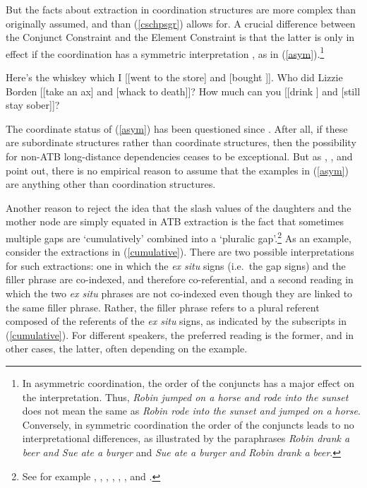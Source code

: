 \documentclass[output=paper
 	        ,biblatex
                ,babelshorthands
                ,newtxmath
                ,draftmode
                ,colorlinks, citecolor=brown
]{langscibook}
\begin{document}
But the facts about extraction in coordination structures are more complex than originally assumed, and than (\ref{cschpsgr}) allows for. A crucial  difference between the Conjunct Constraint and the Element Constraint is  that the latter is only in effect if the coordination has a symmetric interpretation  \citep{Ross67,goldsmith,lakoff86,levinprince86}, as in  (\ref{asym}).\footnote{In asymmetric coordination, the order of the conjuncts has a major effect on the interpretation.
  Thus, \emph{Robin jumped on a horse and rode into the sunset} does not 
mean the same as  \emph{Robin rode into the sunset and jumped on a horse}. Conversely,
in symmetric coordination the order of the conjuncts leads to no interpretational  differences,
as illustrated by the paraphrases \emph{Robin drank a beer and Sue ate a burger}
and \emph{Sue ate a burger and Robin drank a beer}.}


\eal  \label{asym}
\ex
 Here's the whiskey  which I [[went to the store] and [bought \spc]].
\ex Who did Lizzie Borden [[take an ax] and [whack \spcs to death]]?
\ex How much can you [[drink \spc] and [still stay sober]]?
\zl


\noindent
The coordinate status of (\ref{asym}) has been questioned since \cite{Ross67}. After all, if these are subordinate structures rather than coordinate structures, then the possibility for non-ATB long-distance dependencies ceases to be exceptional. But as 
\citet{schmerling72},  \citet{lakoff86}, \citet{levinepostal} and \citet{kehler}  point out,  there is no empirical reason to assume that the examples in (\ref{asym}) are anything other than coordination structures. 

Another reason to reject the idea that  the {\sc slash} values of the daughters and the mother node are simply equated in ATB extraction is the fact that sometimes multiple gaps are `cumulatively' combined into a `pluralic gap'.\footnote{See for example  \citet{munn98atb,munn99atb},  \citet[136, 160]{postal98},
    \citet[125]{kehler},
 \citet{gawronkehlersalt}, 
 \citet{zhang}, \citet{chavessubjexp}, and \citet{Vicente2016-NELS46}.}
As an example, consider the extractions in (\ref{cumulative}). There are two possible interpretations
for such extractions: one in which the \emph{ex situ} signs (i.e.\ the gap signs) and the filler phrase are co-indexed, and therefore co-referential, and a second reading in which the two \emph{ex situ} phrases are not co-indexed even though they are linked to the same filler phrase.  Rather, the filler phrase refers to a plural
 referent composed of the referents of the \emph{ex situ} signs, as indicated by the subscripts 
in (\ref{cumulative}). For different speakers, the preferred reading is the former, and in other cases,
the latter, often depending on the example.
\end{document}
